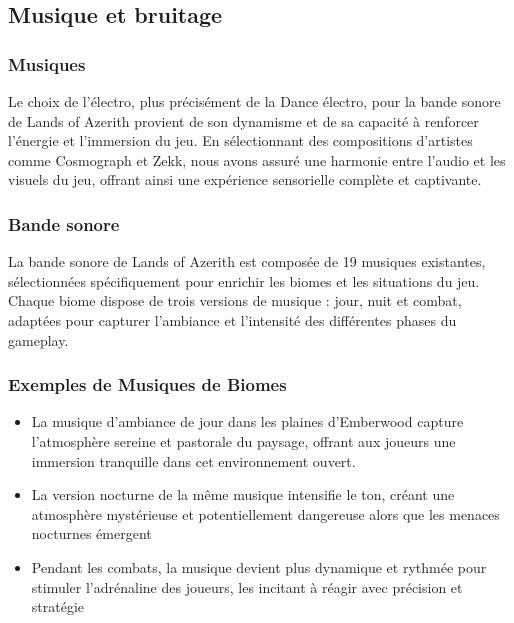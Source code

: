 \subsection{Musique et bruitage}

\subsubsection{Musiques}

Le choix de l'électro, plus précisément de la Dance électro, pour la bande sonore de Lands of Azerith provient de son dynamisme et de sa capacité à renforcer l'énergie et l'immersion du jeu. 
En sélectionnant des compositions d'artistes comme Cosmograph et Zekk, nous avons assuré une harmonie entre l'audio et les visuels du jeu, offrant ainsi une expérience sensorielle complète et captivante.

\subsubsection{Bande sonore}

La bande sonore de Lands of Azerith est composée de 19 musiques existantes, sélectionnées spécifiquement pour enrichir les biomes et les situations du jeu. 
Chaque biome dispose de trois versions de musique : jour, nuit et combat, adaptées pour capturer l'ambiance et l'intensité des différentes phases du gameplay.

\subsubsection{Exemples de Musiques de Biomes}

\begin{itemize}
    \item La musique d'ambiance de jour dans les plaines d'Emberwood capture l'atmosphère sereine et pastorale du paysage, offrant aux joueurs une immersion tranquille dans cet environnement ouvert.
    \\

    \item La version nocturne de la même musique intensifie le ton, créant une atmosphère mystérieuse et potentiellement dangereuse alors que les menaces nocturnes émergent 
    \\

    \item Pendant les combats, la musique devient plus dynamique et rythmée pour stimuler l'adrénaline des joueurs, les incitant à réagir avec précision et stratégie

\end{itemize}


